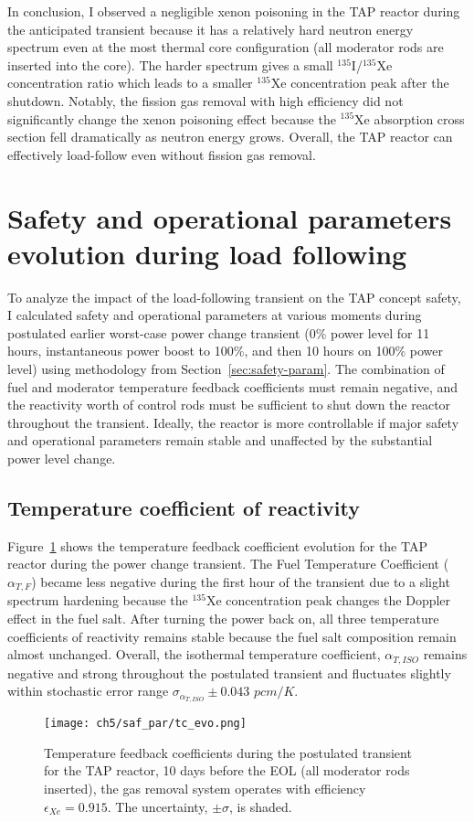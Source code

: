 In conclusion, I observed a negligible xenon poisoning in the \gls{TAP} 
reactor during the anticipated transient because it has a relatively hard 
neutron energy spectrum even at the most thermal core configuration (all 
moderator rods are inserted into the core). The harder spectrum gives 
a small $^{135}$I/$^{135}$Xe concentration ratio which leads to a smaller 
$^{135}$Xe concentration peak after the shutdown. Notably, the fission gas 
removal with high efficiency did not significantly change the xenon poisoning 
effect because the $^{135}$Xe absorption cross section fell dramatically as 
neutron energy grows. Overall, the \gls{TAP} reactor can effectively 
load-follow even without fission gas removal. 

\section{Safety and operational parameters evolution during load following} 
\label{ch5:saf_param}
To analyze the impact of the load-following transient on the \gls{TAP} concept 
safety, I calculated safety and operational parameters at various moments 
during postulated earlier worst-case power change transient (0\% power level 
for 11 hours, instantaneous power boost to 100\%, and then 10 hours on 100\% 
power level) using methodology from Section~\ref{sec:safety-param}. The 
combination of fuel and moderator temperature feedback coefficients must 
remain negative, and the reactivity worth of control rods must be sufficient 
to shut down the reactor throughout the transient. Ideally, the reactor is 
more controllable if major safety and operational parameters remain stable and 
unaffected by the substantial power level change.

\subsection{Temperature coefficient of reactivity}
Figure~\ref{fig:lf-tap-tc-evo} shows the temperature feedback coefficient 
evolution for the \gls{TAP} reactor during the power change transient. The 
Fuel Temperature Coefficient ($\alpha_{T,F}$) became less negative during the 
first hour of the transient due to a slight spectrum hardening because the  
$^{135}$Xe concentration peak changes the Doppler effect in the fuel salt. 
After turning the power back on, all three temperature coefficients of 
reactivity remains stable because the fuel salt composition remain almost 
unchanged. Overall, the isothermal temperature coefficient, $\alpha_{T,ISO}$ 
remains negative and strong throughout the postulated transient and 
fluctuates slightly within stochastic error range 
$\sigma_{\alpha_{T,ISO}}\pm0.043$ $pcm/K$. 
\begin{figure}[htp!] %
	\centering
	\texttt{[image: ch5/saf\_par/tc\_evo.png]}
	\caption{Temperature feedback coefficients during the postulated 
		transient for the \gls{TAP} reactor, 10 days before the \gls{EOL} (all 
		moderator rods inserted), the gas removal system operates with 
		efficiency $\epsilon_{Xe}=0.915$. The uncertainty, $\pm\sigma$, is 
		shaded.}
		\label{fig:lf-tap-tc-evo}
\end{figure}

